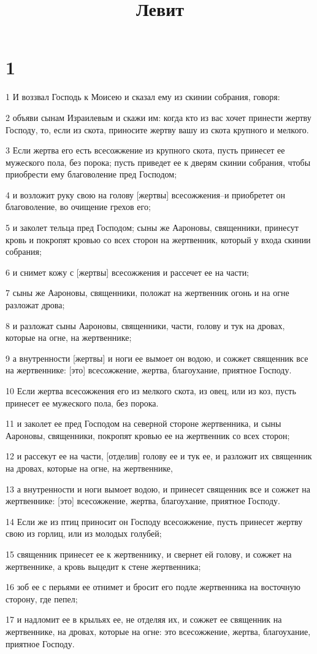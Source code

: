 

\title{Левит}


\chapter{1}

\par 1 И воззвал Господь к Моисею и сказал ему из скинии собрания, говоря:
\par 2 объяви сынам Израилевым и скажи им: когда кто из вас хочет принести жертву Господу, то, если из скота, приносите жертву вашу из скота крупного и мелкого.
\par 3 Если жертва его есть всесожжение из крупного скота, пусть принесет ее мужеского пола, без порока; пусть приведет ее к дверям скинии собрания, чтобы приобрести ему благоволение пред Господом;
\par 4 и возложит руку свою на голову [жертвы] всесожжения--и приобретет он благоволение, во очищение грехов его;
\par 5 и заколет тельца пред Господом; сыны же Аароновы, священники, принесут кровь и покропят кровью со всех сторон на жертвенник, который у входа скинии собрания;
\par 6 и снимет кожу с [жертвы] всесожжения и рассечет ее на части;
\par 7 сыны же Аароновы, священники, положат на жертвенник огонь и на огне разложат дрова;
\par 8 и разложат сыны Аароновы, священники, части, голову и тук на дровах, которые на огне, на жертвеннике;
\par 9 а внутренности [жертвы] и ноги ее вымоет он водою, и сожжет священник все на жертвеннике: [это] всесожжение, жертва, благоухание, приятное Господу.
\par 10 Если жертва всесожжения его из мелкого скота, из овец, или из коз, пусть принесет ее мужеского пола, без порока.
\par 11 и заколет ее пред Господом на северной стороне жертвенника, и сыны Аароновы, священники, покропят кровью ее на жертвенник со всех сторон;
\par 12 и рассекут ее на части, [отделив] голову ее и тук ее, и разложит их священник на дровах, которые на огне, на жертвеннике,
\par 13 а внутренности и ноги вымоет водою, и принесет священник все и сожжет на жертвеннике: [это] всесожжение, жертва, благоухание, приятное Господу.
\par 14 Если же из птиц приносит он Господу всесожжение, пусть принесет жертву свою из горлиц, или из молодых голубей;
\par 15 священник принесет ее к жертвеннику, и свернет ей голову, и сожжет на жертвеннике, а кровь выцедит к стене жертвенника;
\par 16 зоб ее с перьями ее отнимет и бросит его подле жертвенника на восточную сторону, где пепел;
\par 17 и надломит ее в крыльях ее, не отделяя их, и сожжет ее священник на жертвеннике, на дровах, которые на огне: это всесожжение, жертва, благоухание, приятное Господу.

